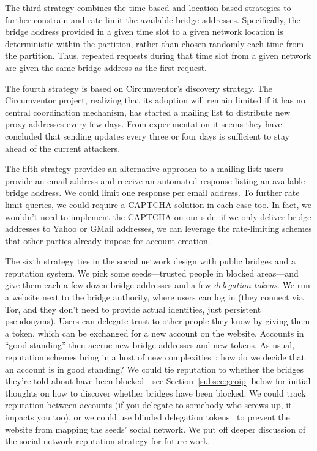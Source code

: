 \documentclass{llncs}
\begin{document}
The third strategy combines the time-based and location-based
strategies to further constrain and rate-limit the available bridge
addresses. Specifically, the bridge address provided in a given time
slot to a given network location is deterministic within the partition,
rather than chosen randomly each time from the partition. Thus, repeated
requests during that time slot from a given network are given the same
bridge address as the first request.

The fourth strategy is based on Circumventor's discovery strategy.
The Circumventor project, realizing that its adoption will remain limited
if it has no central coordination mechanism, has started a mailing list to
distribute new proxy addresses every few days. From experimentation it
seems they have concluded that sending updates every three or four days
is sufficient to stay ahead of the current attackers.

The fifth strategy provides an alternative approach to a mailing list:
users provide an email address and receive an automated response
listing an available bridge address. We could limit one response per
email address. To further rate limit queries, we could require a CAPTCHA
solution
in each case too. In fact, we wouldn't need to
implement the CAPTCHA on our side: if we only deliver bridge addresses
to Yahoo or GMail addresses, we can leverage the rate-limiting schemes
that other parties already impose for account creation.

The sixth strategy ties in the social network design with public
bridges and a reputation system. We pick some seeds---trusted people in
blocked areas---and give them each a few dozen bridge addresses and a few
\emph{delegation tokens}. We run a website next to the bridge authority,
where users can log in (they connect via Tor, and they don't need to
provide actual identities, just persistent pseudonyms). Users can delegate
trust to other people they know by giving them a token, which can be
exchanged for a new account on the website. Accounts in ``good standing''
then accrue new bridge addresses and new tokens. As usual, reputation
schemes bring in a host of new complexities~\cite{rep-anon}: how do we
decide that an account is in good standing? We could tie reputation
to whether the bridges they're told about have been blocked---see
Section~\ref{subsec:geoip} below for initial thoughts on how to discover
whether bridges have been blocked. We could track reputation between
accounts (if you delegate to somebody who screws up, it impacts you too),
or we could use blinded delegation tokens~\cite{chaum-blind} to prevent
the website from mapping the seeds' social network. We put off deeper
discussion of the social network reputation strategy for future work.
\end{document}
